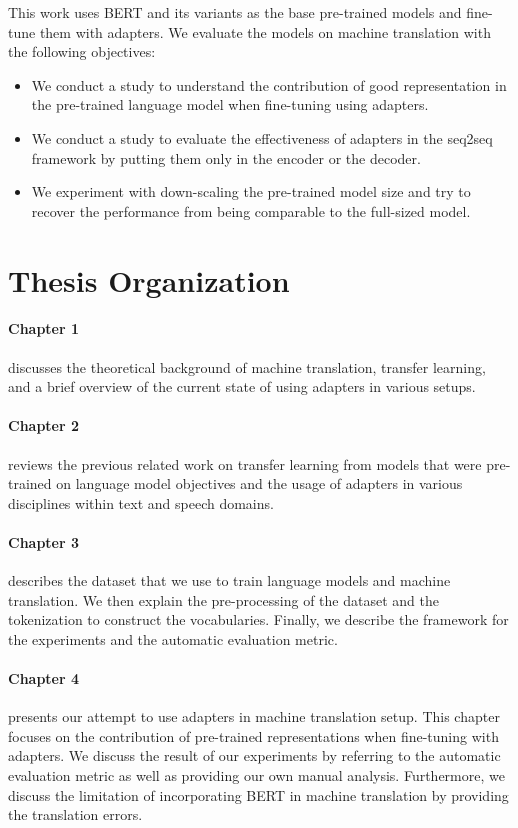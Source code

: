 This work uses BERT and its variants as the base pre-trained models and fine-tune them with adapters. We evaluate the models on machine translation with the following objectives:
\begin{itemize}
    \item We conduct a study to understand the contribution of good representation in the pre-trained language model when fine-tuning using adapters.
    \item We conduct a study to evaluate the effectiveness of adapters in the seq2seq framework by putting them only in the encoder or the decoder.
    \item We experiment with down-scaling the pre-trained model size and try to recover the performance from being comparable to the full-sized model.
\end{itemize}

\section*{Thesis Organization}

\paragraph{Chapter 1} discusses the theoretical background of machine translation, transfer learning, and a brief overview of the current state of using adapters in various setups.

\paragraph{Chapter 2} reviews the previous related work on transfer learning from models that were pre-trained on language model objectives and the usage of adapters in various disciplines within text and speech domains.

\paragraph{Chapter 3} describes the dataset that we use to train language models and machine translation. We then explain the pre-processing of the dataset and the tokenization to construct the vocabularies. Finally, we describe the framework for the experiments and the automatic evaluation metric.

\paragraph{Chapter 4} presents our attempt to use adapters in machine translation setup. This chapter focuses on the contribution of pre-trained representations when fine-tuning with adapters. We discuss the result of our experiments by referring to the automatic evaluation metric as well as providing our own manual analysis. Furthermore, we discuss the limitation of incorporating BERT in machine translation by providing the translation errors.

